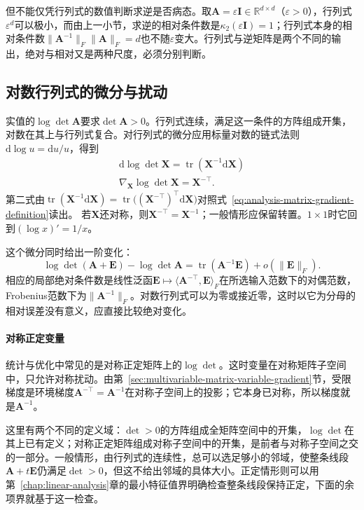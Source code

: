 但不能仅凭行列式的数值判断求逆是否病态。取$\bm A=\varepsilon\bm I\in\mathbb R^{d\times d}$（$\varepsilon>0$），行列式$\varepsilon^d$可以极小，而由上一小节，求逆的相对条件数是$\kappa_2(\varepsilon\bm I)=1$；行列式本身的相对条件数$\lVert\bm A^{-1}\rVert_F\lVert\bm A\rVert_F=d$也不随$\varepsilon$变大。行列式与逆矩阵是两个不同的输出，绝对与相对又是两种尺度，必须分别判断。

\subsection{对数行列式的微分与扰动}
\label{sec:multivariable-logdet-differential}

实值的$\log\det\bm A$要求$\det\bm A>0$。行列式连续，满足这一条件的方阵组成开集，对数在其上与行列式复合。对行列式的微分应用标量对数的链式法则$\mathrm d\log u=\mathrm du/u$，得到
\begin{equation}
\begin{gathered}
\mathrm{d}\log\det\bm{X}
  =
  \operatorname{tr}(\bm{X}^{-1}\mathrm{d}\bm{X})\\
\nabla_{\bm{X}}\log\det\bm{X}
  =
  \bm{X}^{-\top}.
\end{gathered}
\label{eq:analysis-logdet-gradient}
\end{equation}
第二式由$\operatorname{tr}(\bm X^{-1}\mathrm d\bm X)=\operatorname{tr}\bigl((\bm X^{-\top})^\top\mathrm d\bm X\bigr)$对照式~\eqref{eq:analysis-matrix-gradient-definition}读出。
若$\bm X$还对称，则$\bm{X}^{-\top}=\bm{X}^{-1}$；一般情形应保留转置。$1\times1$时它回到$(\log x)'=1/x$。

这个微分同时给出一阶变化：
\[
 \log\det(\bm A+\bm E)-\log\det\bm A
 =\operatorname{tr}(\bm A^{-1}\bm E)+o(\lVert\bm E\rVert_F).
\]
相应的局部绝对条件数是线性泛函$\bm E\mapsto\langle\bm A^{-\top},\bm E\rangle_F$在所选输入范数下的对偶范数，Frobenius范数下为$\lVert\bm A^{-1}\rVert_F$。对数行列式可以为零或接近零，这时以它为分母的相对误差没有意义，应直接比较绝对变化。

\paragraph{对称正定变量}
统计与优化中常见的是对称正定矩阵上的$\log\det$。这时变量在对称矩阵子空间中，只允许对称扰动。由第~\ref{sec:multivariable-matrix-variable-gradient}节，受限梯度是环境梯度$\bm A^{-\top}=\bm A^{-1}$在对称子空间上的投影；它本身已对称，所以梯度就是$\bm A^{-1}$。

这里有两个不同的定义域：$\det>0$的方阵组成全矩阵空间中的开集，$\log\det$在其上已有定义；对称正定矩阵组成对称子空间中的开集，是前者与对称子空间之交的一部分。一般情形，由行列式的连续性，总可以选足够小的邻域，使整条线段$\bm A+t\bm E$仍满足$\det>0$，但这不给出邻域的具体大小。正定情形则可以用第~\ref{chap:linear-analysis}章的最小特征值界明确检查整条线段保持正定，下面的余项界就基于这一检查。

